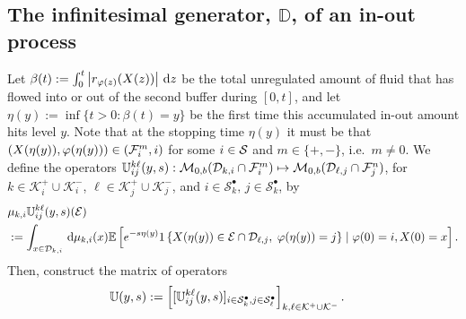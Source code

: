 \subsection{The infinitesimal generator, \(\mathbb D\), of an in-out process}
Let $\beta(t) := \int_0^t \left| r_{\varphi(z)}(X(z)) \right|  \, \mathrm{d} z$ be the total unregulated amount of fluid that has flowed into or out of the second buffer during $[0,t]$, and let $\eta(y) := \inf \{t > 0: \beta(t) = y\}$ be the first time this accumulated in-out amount hits level $y$. Note that at the stopping time \(\eta(y)\) it must be that \((X({\eta(y)}),\varphi({\eta(y)}))\in(\mathcal{F}_i^m,i)\) for some \(i\in\mathcal{S}\) and \(m\in\{+,-\}\), i.e.~\(m\neq0\). We define the operators $\mathbb{U}_{ij}^{k\ell}(y,s): \mathcal{M}_{0,b}(\mathcal{D}_{k,i}\cap\mathcal{F}_i^m) \mapsto \mathcal{M}_{0,b} (\mathcal{D}_{\ell,j}\cap\mathcal{F}_j^n)$, for $k\in\mathcal K_i^+\cup\mathcal K_i^-$,  $\ell\in\mathcal K_j^+\cup\mathcal K_j^-$, and $i \in \mathcal{S}_k^\bullet,\,j \in \mathcal{S}_k^\bullet$, by 
% 
	\begin{align*} 
		&\mu_{k,i}\mathbb{U}_{ij}^{k\ell} (y,s) (\mathcal{E}) 
		\\&:= \int_{x \in \mathcal{D}_{k,i}} \, \mathrm{d}  \mu_{k,i}(x) \mathbb{E}\left[e^{-s\eta(y)}{1}\left\{X({\eta(y)}) \in \mathcal{E}\cap\mathcal{D}_{\ell,j},\;\varphi({\eta(y)}) = j\right\} \mid \varphi(0) = i, X(0) = x\right].
	\end{align*} 
Then, construct the matrix of operators 
\begin{align*}
\mathbb U(y,s) &:= \left[[\mathbb U_{ij}^{k\ell}(y,s)]_{i\in\mathcal{S}_k^\bullet,j\in\mathcal{S}_\ell^\bullet}\right]_{k,\ell\in\mathcal K^+\cup\mathcal K^-}.\end{align*}
